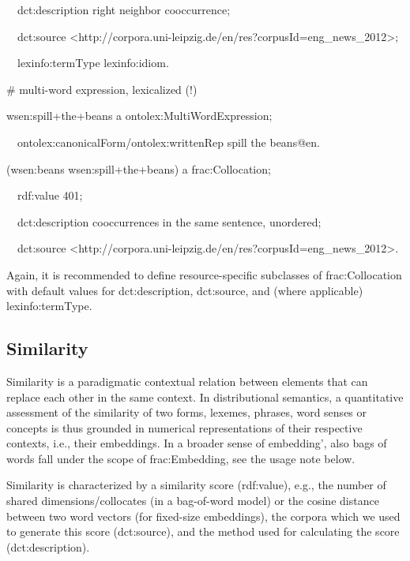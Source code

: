 \documentclass[a4paper]{article}
\newcommand\textstyleSourceText[1]{\textrm{#1}}
\newcommand\textstyleTeletype[1]{\textrm{#1}}
\begin{document}
\textstyleSourceText{\ \ dct:description {\textquotedbl}right neighbor cooccurrence{\textquotedbl};}

\textstyleSourceText{\ \ dct:source {\textless}http://corpora.uni-leipzig.de/en/res?corpusId=eng\_news\_2012{\textgreater};}

\textstyleSourceText{\ \ lexinfo:termType lexinfo:idiom.}


\bigskip

\textstyleSourceText{\# multi-word expression, lexicalized (!)}

\textstyleSourceText{wsen:spill+the+beans a ontolex:MultiWordExpression;}

\textstyleSourceText{\ \ ontolex:canonicalForm/ontolex:writtenRep {\textquotedbl}spill the beans{\textquotedbl}@en.}


\bigskip

\textstyleSourceText{(wsen:beans wsen:spill+the+beans) a frac:Collocation;}

\textstyleSourceText{\ \ rdf:value {\textquotedbl}401{\textquotedbl};}

\textstyleSourceText{\ \ dct:description {\textquotedbl}cooccurrences in the same sentence, unordered{\textquotedbl};}

\textstyleSourceText{\ \ dct:source {\textless}http://corpora.uni-leipzig.de/en/res?corpusId=eng\_news\_2012{\textgreater}.}

%
%
%
Again, it is recommended to define resource-specific subclasses of \textstyleTeletype{frac:Collocation} with default values for \textstyleTeletype{dct:description}, \textstyleTeletype{dct:source}, and (where applicable) \textstyleTeletype{lexinfo:termType}. 

\subsection[Similarity]{Similarity}
Similarity is a paradigmatic contextual relation between elements that can replace each other in the same context. In distributional semantics, a quantitative assessment of the similarity of two forms, lexemes, phrases, word senses or concepts is thus grounded in numerical representations of their respective contexts, i.e., their embeddings. In a broader sense of {\textasciigrave}embedding', also bags of words fall under the scope of \textstyleTeletype{frac:Embedding}, see the usage note below. 

Similarity is characterized by a similarity score (\textstyleTeletype{rdf:value}), e.g., the number of shared dimensions/collocates (in a bag-of-word model) or the cosine distance between two word vectors (for fixed-size embeddings), the corpora which we used to generate this score (\textstyleTeletype{dct:source}), and the method used for calculating the score (\textstyleTeletype{dct:description}).
\end{document}

